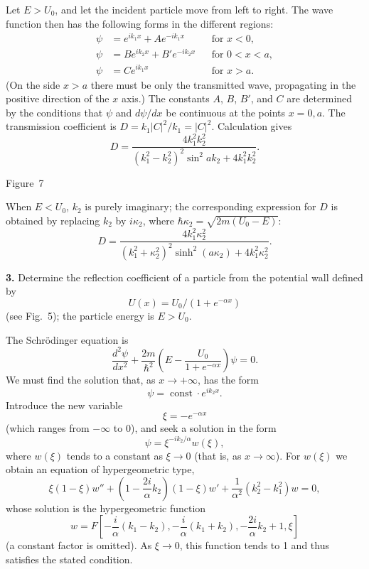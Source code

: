 \SolutionHeading
Let $E>U_0$, and let the incident particle move from left to right. The wave
function then has the following forms in the different regions:
\[
  \begin{aligned}
    \psi&=e^{ik_1x}+Ae^{-ik_1x} &&\text{for }x<0,\\
    \psi&=Be^{ik_2x}+B'e^{-ik_2x} &&\text{for }0<x<a,\\
    \psi&=Ce^{ik_1x} &&\text{for }x>a.
  \end{aligned}
\]
(On the side $x>a$ there must be only the transmitted wave, propagating in
the positive direction of the $x$ axis.) The constants $A$, $B$, $B'$, and
$C$ are determined by the conditions that $\psi$ and $d\psi/dx$ be
continuous at the points $x=0,a$. The transmission coefficient is
$D=k_1|C|^2/k_1=|C|^2$. Calculation gives
\[
  D=\frac{4k_1^2k_2^2}
  {(k_1^2-k_2^2)^2\sin^2ak_2+4k_1^2k_2^2}.
\]

\begin{center}

\small Figure~7
\end{center}

When $E<U_0$, $k_2$ is purely imaginary; the corresponding expression for
$D$ is obtained by replacing $k_2$ by $i\kappa_2$, where
$\hbar\kappa_2=\sqrt{2m(U_0-E)}$:
\[
  D=\frac{4k_1^2\kappa_2^2}
  {(k_1^2+\kappa_2^2)^2\sinh^2(a\kappa_2)
    +4k_1^2\kappa_2^2}.
\]

\ProblemHeading
\textbf{3.} Determine the reflection coefficient of a particle from the
potential wall defined by
\[
  U(x)=U_0/(1+e^{-\alpha x})
\]
(see Fig.~5); the particle energy is $E>U_0$.

\SolutionHeading
The Schrödinger equation is
\[
  \frac{d^2\psi}{dx^2}+\frac{2m}{\hbar^2}
  \left(E-\frac{U_0}{1+e^{-\alpha x}}\right)\psi=0.
\]
We must find the solution that, as $x\to+\infty$, has the form
\[
  \psi=\operatorname{const}\cdot e^{ik_2x}.
\]
Introduce the new variable
\[
  \xi=-e^{-\alpha x}
\]
(which ranges from $-\infty$ to 0), and seek a solution in the form
\[
  \psi=\xi^{-ik_2/\alpha}w(\xi),
\]
where $w(\xi)$ tends to a constant as $\xi\to0$ (that is, as
$x\to\infty$). For $w(\xi)$ we obtain an equation of hypergeometric type,
\[
  \xi(1-\xi)w''+
  \left(1-\frac{2i}{\alpha}k_2\right)(1-\xi)w'
  +\frac{1}{\alpha^2}(k_2^2-k_1^2)w=0,
\]
whose solution is the hypergeometric function
\[
  w=F\left[-\frac{i}{\alpha}(k_1-k_2),
  -\frac{i}{\alpha}(k_1+k_2),-\frac{2i}{\alpha}k_2+1,\xi\right]
\]
(a constant factor is omitted). As $\xi\to0$, this function tends to 1 and
thus satisfies the stated condition.

